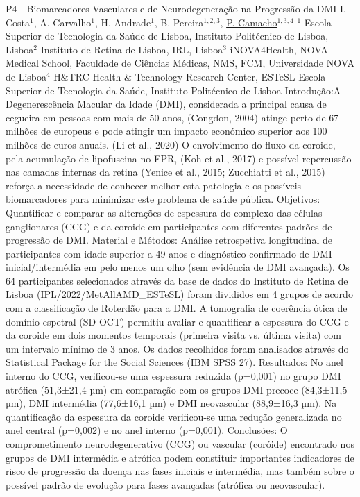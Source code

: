 
    \begin{abstract_online}{P4 - Biomarcadores Vasculares e de Neurodegeneração na Progressão da DMI}{%
        I. Costa$^{1}$, A. Carvalho$^{1}$, H. Andrade$^{1}$, B. Pereira$^{1,2,3}$, \underline{P. Camacho}$^{1,3,4}$}{%
        }{%
        $^1$ Escola Superior de Tecnologia da Saúde de Lisboa, Instituto Politécnico de Lisboa, Lisboa\newline{}$^2$ Instituto de Retina de Lisboa, IRL, Lisboa\newline{}$^3$  iNOVA4Health, NOVA Medical School, Faculdade de Ciências Médicas, NMS, FCM, Universidade NOVA de Lisboa\newline{}$^4$ H\&TRC-Health \& Technology Research Center, ESTeSL Escola Superior de Tecnologia da Saúde, Instituto Politécnico de Lisboa}
        Introdução:A Degenerescência Macular da Idade (DMI), considerada a principal causa de cegueira em pessoas com mais de 50 anos, (Congdon, 2004) atinge perto de 67 milhões de europeus e pode atingir um impacto económico superior aos 100 milhões de euros anuais. (Li et al., 2020) O envolvimento do fluxo da coroide, pela acumulação de lipofuscina no EPR, (Koh et al., 2017) e possível repercussão nas camadas internas da retina (Yenice et al., 2015; Zucchiatti et al., 2015) reforça a necessidade de conhecer melhor esta patologia e os possíveis biomarcadores para minimizar este problema de saúde pública.\newline{} 
        Objetivos: Quantificar e comparar as alterações de espessura do complexo das células ganglionares (CCG) e da coroide em participantes com diferentes padrões de progressão de DMI.\newline{}
        Material e Métodos: Análise retrospetiva longitudinal de participantes com idade superior a 49 anos e diagnóstico confirmado de DMI inicial/intermédia em pelo menos um olho (sem evidência de DMI avançada). Os 64 participantes selecionados através da base de dados do Instituto de Retina de Lisboa (IPL/2022/MetAllAMD\_ESTeSL) foram divididos em 4 grupos de acordo com a classificação de Roterdão para a DMI. A tomografia de coerência ótica de domínio espetral (SD-OCT) permitiu avaliar e quantificar a espessura do CCG e da coroide em dois momentos temporais (primeira visita vs. última visita) com um intervalo mínimo de 3 anos. Os dados recolhidos foram analisados através do Statistical Package for the Social Sciences (IBM SPSS 27).\newline{}
        Resultados: No anel interno do CCG, verificou-se uma espessura reduzida (p=0,001) no grupo DMI atrófica (51,3±21,4 µm) em comparação com os grupos DMI precoce (84,3±11,5 µm), DMI intermédia (77,6±16,1 µm) e DMI neovascular (88,9±16,3 µm). Na quantificação da espessura da coroide verificou-se uma redução generalizada no anel central (p=0,002) e no anel interno (p=0,001).
        \newline{}
        Conclusões: O comprometimento neurodegenerativo (CCG) ou vascular (coróide) encontrado nos grupos de DMI intermédia e atrófica podem constituir importantes indicadores de risco de progressão da doença nas fases iniciais e intermédia, mas também sobre o possível padrão de evolução para fases avançadas (atrófica ou neovascular).
    \end{abstract_online}
    